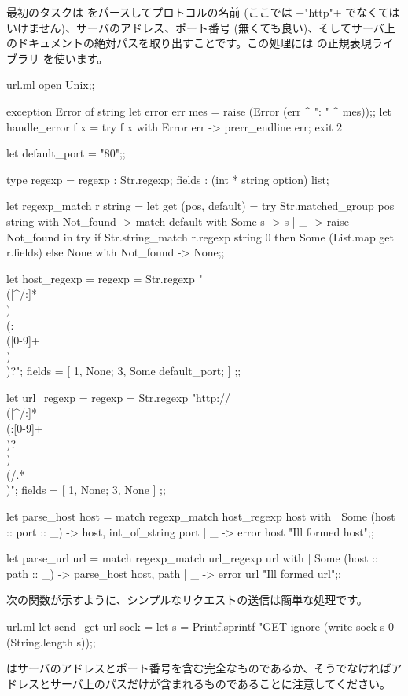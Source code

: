 最初のタスクは \URL をパースしてプロトコルの名前 (ここでは \ml+"http"+ でなくてはいけません)、サーバのアドレス、ポート番号 (無くても良い)、そしてサーバ上のドキュメントの絶対パスを取り出すことです。この処理には \ocaml の正規表現ライブラリ  を使います。
%
\begin{listingcodefile}{url.ml}
open Unix;;

exception Error of string
let error err mes = raise (Error (err ^ ": " ^ mes));;
let handle_error f x = try f x with Error err -> prerr_endline err; exit 2

let default_port = "80";;

type regexp = { regexp : Str.regexp; fields : (int * string option) list; }

let regexp_match r string =
  let get (pos, default) =
    try Str.matched_group pos string
    with Not_found ->
      match default with Some s -> s | _ -> raise Not_found in
  try
    if Str.string_match r.regexp string 0 then
      Some (List.map get r.fields)
    else None
  with Not_found -> None;;

let host_regexp =
  { regexp = Str.regexp "\\([^/:]*\\)\\(:\\([0-9]+\\)\\)?";
    fields = [ 1, None; 3, Some default_port; ] };;

let url_regexp =
  { regexp = Str.regexp "http://\\([^/:]*\\(:[0-9]+\\)?\\)\\(/.*\\)";
    fields = [ 1, None; 3, None ] };;

let parse_host host = match regexp_match host_regexp host with
  | Some (host :: port :: _) -> host, int_of_string port
  | _ -> error host "Ill formed host";;

let parse_url url = match regexp_match url_regexp url with
  | Some (host :: path :: _) -> parse_host host, path
  | _ -> error url "Ill formed url";;
\end{listingcodefile}
%
次の関数が示すように、シンプルなリクエストの送信は簡単な処理です。
%
\begin{listingcodefile}{url.ml}
let send_get url sock =
  let s = Printf.sprintf "GET %
  ignore (write sock s 0 (String.length s));;
\end{listingcodefile}
%
\URL はサーバのアドレスとポート番号を含む完全なものであるか、そうでなければアドレスとサーバ上のパスだけが含まれるものであることに注意してください。

